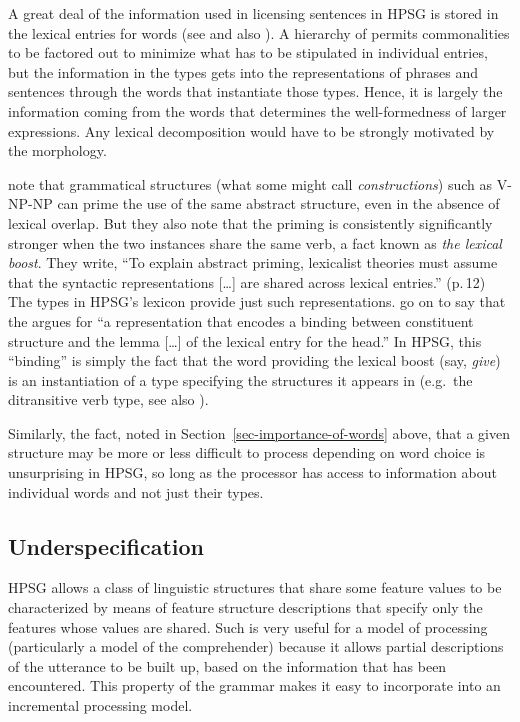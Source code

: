 \documentclass[output=paper
 	        ,biblatex
                ,babelshorthands
                ,newtxmath
                ,draftmode
                ,colorlinks, citecolor=brown
]{langscibook}
\begin{document}
A great deal of the information used in licensing sentences in HPSG is stored in the lexical entries
for words (see \citealp{MWArgSt} and also ).  A hierarchy of
 permits commonalities to be factored out to minimize what has to be stipulated
in individual entries, but the information in the types gets into the representations of phrases and
sentences through the words that instantiate those types. Hence, it is largely the
information coming from the words that determines the well-formedness of larger expressions.  Any
lexical decomposition would have to be strongly motivated by the morphology.

\citet[Section~2.3]{BraniganPickering2017} note that grammatical structures (what some might call
\emph{constructions}) such as V-NP-NP can prime the use of the same abstract
structure, even in the absence of lexical overlap.  But they also note that the priming is
consistently significantly stronger when the two instances share the same verb, a fact known as
\emph{the lexical boost}.  They write, ``To explain abstract priming, lexicalist
theories must assume that the syntactic representations [\ldots] are shared across lexical
entries.'' (p.\,12) The types in HPSG's lexicon provide just such
representations. \citeauthor{BraniganPickering2017} go on to say that the  argues
for ``a representation that encodes a binding between constituent structure and the lemma [\ldots]
of the lexical entry for the head.''  In HPSG, this ``binding'' is simply the fact that the word
providing the lexical boost (say, \emph{give}) is an instantiation of a type specifying the
structures it appears in (e.g.\ the ditransitive verb type, see also \citealp*{YKD2019a-u}).

Similarly, the fact, noted in Section~\ref{sec-importance-of-words} above, that a given structure
may be more or less difficult to process depending on word choice is unsurprising in HPSG, so long
as the processor has access to information about individual words and not just their types.    

\subsection{Underspecification}

HPSG allows a class of linguistic structures that share some feature values to be characterized by
means of feature structure descriptions that specify only the features whose values are shared.
Such  is very useful for a model of processing (particularly a model of the
comprehender) because it allows partial descriptions of the utterance to be built up, based on the
information that has been encountered.  This property of the grammar makes it easy to incorporate
into an incremental processing model.
\end{document}

